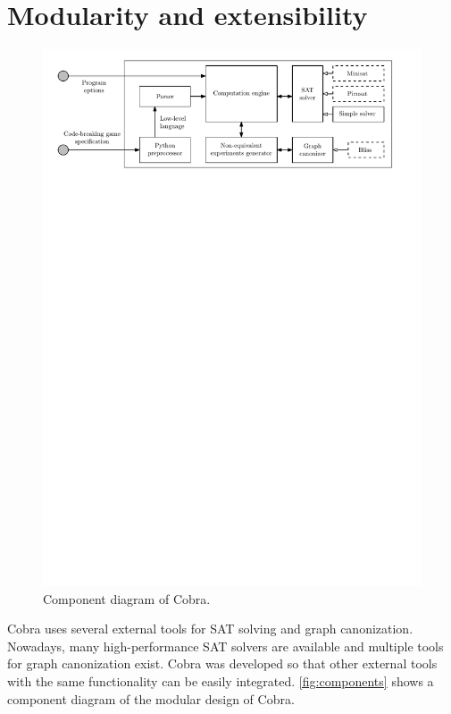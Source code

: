 \section{Modularity and extensibility}

\begin{figure}[ht]
\includegraphics[width=\textwidth]{pictures/modularity.pdf}
\caption{Component diagram of Cobra.}
\label{fig:components}
\end{figure}


Cobra uses several external tools for SAT solving and graph canonization.
Nowadays, many high-performance SAT solvers are available
  and multiple tools for graph canonization exist.
Cobra was developed so that other external tools with the same functionality
  can be easily integrated.
\autoref{fig:components} shows a component diagram of
  the modular design of Cobra.

